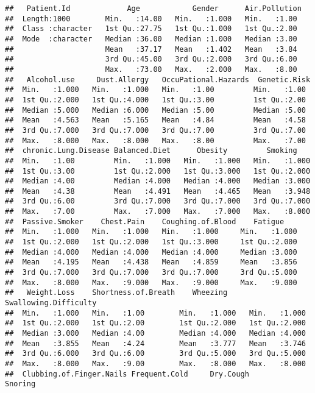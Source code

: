 \documentclass[]{article}
\begin{document}
\begin{verbatim}
##   Patient.Id             Age            Gender      Air.Pollution 
##  Length:1000        Min.   :14.00   Min.   :1.000   Min.   :1.00  
##  Class :character   1st Qu.:27.75   1st Qu.:1.000   1st Qu.:2.00  
##  Mode  :character   Median :36.00   Median :1.000   Median :3.00  
##                     Mean   :37.17   Mean   :1.402   Mean   :3.84  
##                     3rd Qu.:45.00   3rd Qu.:2.000   3rd Qu.:6.00  
##                     Max.   :73.00   Max.   :2.000   Max.   :8.00  
##   Alcohol.use     Dust.Allergy   OccuPational.Hazards  Genetic.Risk 
##  Min.   :1.000   Min.   :1.000   Min.   :1.00         Min.   :1.00  
##  1st Qu.:2.000   1st Qu.:4.000   1st Qu.:3.00         1st Qu.:2.00  
##  Median :5.000   Median :6.000   Median :5.00         Median :5.00  
##  Mean   :4.563   Mean   :5.165   Mean   :4.84         Mean   :4.58  
##  3rd Qu.:7.000   3rd Qu.:7.000   3rd Qu.:7.00         3rd Qu.:7.00  
##  Max.   :8.000   Max.   :8.000   Max.   :8.00         Max.   :7.00  
##  chronic.Lung.Disease Balanced.Diet      Obesity         Smoking     
##  Min.   :1.00         Min.   :1.000   Min.   :1.000   Min.   :1.000  
##  1st Qu.:3.00         1st Qu.:2.000   1st Qu.:3.000   1st Qu.:2.000  
##  Median :4.00         Median :4.000   Median :4.000   Median :3.000  
##  Mean   :4.38         Mean   :4.491   Mean   :4.465   Mean   :3.948  
##  3rd Qu.:6.00         3rd Qu.:7.000   3rd Qu.:7.000   3rd Qu.:7.000  
##  Max.   :7.00         Max.   :7.000   Max.   :7.000   Max.   :8.000  
##  Passive.Smoker    Chest.Pain    Coughing.of.Blood    Fatigue     
##  Min.   :1.000   Min.   :1.000   Min.   :1.000     Min.   :1.000  
##  1st Qu.:2.000   1st Qu.:2.000   1st Qu.:3.000     1st Qu.:2.000  
##  Median :4.000   Median :4.000   Median :4.000     Median :3.000  
##  Mean   :4.195   Mean   :4.438   Mean   :4.859     Mean   :3.856  
##  3rd Qu.:7.000   3rd Qu.:7.000   3rd Qu.:7.000     3rd Qu.:5.000  
##  Max.   :8.000   Max.   :9.000   Max.   :9.000     Max.   :9.000  
##   Weight.Loss    Shortness.of.Breath    Wheezing     Swallowing.Difficulty
##  Min.   :1.000   Min.   :1.00        Min.   :1.000   Min.   :1.000        
##  1st Qu.:2.000   1st Qu.:2.00        1st Qu.:2.000   1st Qu.:2.000        
##  Median :3.000   Median :4.00        Median :4.000   Median :4.000        
##  Mean   :3.855   Mean   :4.24        Mean   :3.777   Mean   :3.746        
##  3rd Qu.:6.000   3rd Qu.:6.00        3rd Qu.:5.000   3rd Qu.:5.000        
##  Max.   :8.000   Max.   :9.00        Max.   :8.000   Max.   :8.000        
##  Clubbing.of.Finger.Nails Frequent.Cold     Dry.Cough        Snoring     

\end{verbatim}
\end{document}

